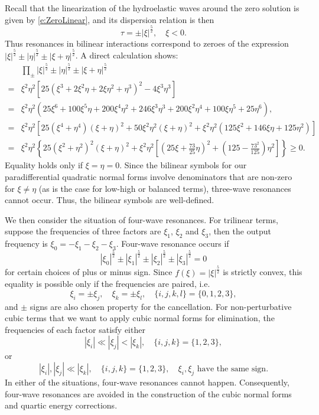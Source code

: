 \documentclass[10pt]{amsart}
\theoremstyle{remark}
\theoremstyle{definition}
\numberwithin{equation}{section}
\newcommand{\f}{\frac}
\begin{document}
Recall that the linearization of the hydroelastic waves around the zero solution is given by \eqref{e:ZeroLinear}, and its dispersion relation is then
\begin{equation} \label{TauXiRelation}
    \tau = \pm |\xi|^{\f52}, \quad \xi<0.
\end{equation}
Thus resonances in bilinear interactions correspond to zeroes of the expression $|\xi|^{\f52} \pm |\eta|^{\f52} \pm |\xi + \eta|^{\f52}$.
A direct calculation shows:
\begin{align*}
    &\prod_{\pm}|\xi|^{\f52}\pm|\eta|^{\f52}\pm|\xi+\eta|^{\f52}\\
=& \xi^2\eta^2[25(\xi^3+2\xi^2\eta+2\xi\eta^2+\eta^3)^2-4\xi^3\eta^3]\\
=&\xi^2\eta^2(25\xi^6+100\xi^5\eta+200\xi^4\eta^2+246\xi^3\eta^3+200\xi^2\eta^4+100\xi\eta^5+25\eta^6), \\
=& \xi^2\eta^2[25(\xi^4+\eta^4)(\xi+\eta)^2+50\xi^2\eta^2(\xi+\eta)^2+\xi^2\eta^2(125\xi^2+146\xi\eta+125\eta^2)] \\
=& \xi^2 \eta^2 \left\{ 25(\xi^2+\eta^2)^2(\xi+\eta)^2+\xi^2\eta^2\left[\left(25\xi+\frac{73}{25}\eta\right)^2+\left(125-\frac{73^2}{125}\right)\eta^2\right]  \right\} \geq 0.
\end{align*}
Equality holds only if $\xi = \eta = 0$.
Since the bilinear symbols for our paradifferential quadratic normal forms involve denominators that are non-zero for $\xi\ne \eta$ (as is the case for low-high or balanced terms), three-wave resonances cannot occur. 
Thus, the bilinear symbols are well-defined.

We then consider the situation of four-wave resonances.
For trilinear terms, suppose the frequencies of three factors are $\xi_1$, $\xi_2$ and $\xi_3$, then the output frequency is $\xi_0 = -\xi_1-\xi_2-\xi_3$. 
Four-wave resonance occurs if
\begin{equation*}
    |\xi_0|^\f52 \pm |\xi_1|^\f52\pm |\xi_2|^\f52\pm|\xi_3|^\f52 = 0
\end{equation*}
for certain choices of plus or minus sign.
Since $f(\xi) = |\xi|^{\f52}$ is strictly convex, this equality is possible only if the frequencies are paired, i.e.
\begin{equation*}
\xi_i = \pm \xi_j, \quad \xi_k = \pm \xi_l, \quad \{i,j,k,l \} = \{0,1,2,3 \},
\end{equation*}
and $\pm$ signs are also chosen property for the cancellation.
For non-perturbative cubic terms that we want to apply cubic normal forms for elimination, the frequencies of each factor satisfy either
\begin{equation*}
    |\xi_i| \ll |\xi_j|< |\xi_k|, \quad \{i,j,k \} = \{1,2,3 \},
\end{equation*}
or
\begin{equation*}
     |\xi_i| , |\xi_j|\ll |\xi_k|, \quad \{i,j,k \} = \{1,2,3 \}, \quad \xi_i,\xi_j \text{ have the same sign}.
\end{equation*}
In either of the situations, four-wave resonances cannot happen. 
Consequently, four-wave resonances are avoided in the construction of the cubic normal forms and quartic energy corrections.
\end{document}
